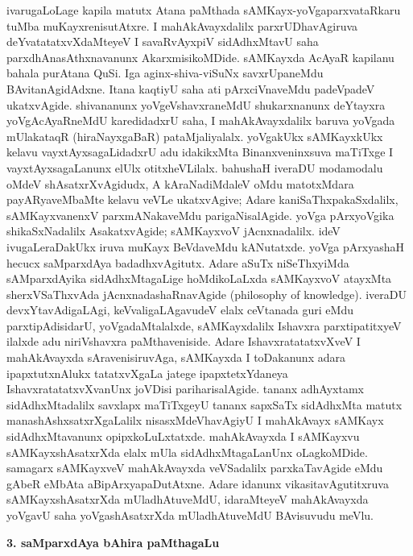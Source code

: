 ivarugaLoLage kapila matutx Atana paMthada sAMKayx-yoVgaparxvataRkaru tuMba muKayxrenisutAtxre. I mahAkAvayxdalilx parxrUDhavAgiruva deYvatatatxvXdaMteyeV I savaRvAyxpiV sidAdhxMtavU saha parxdhAnasAthxnavanunx AkarxmisikoMDide. sAMKayxda AcAyaR kapilanu bahala purAtana QuSi. Iga aginx-shiva-viSuNx savxrUpaneMdu BAvitanAgidAdxne. Itana kaqtiyU saha ati pArxciVnaveMdu padeVpadeV ukatxvAgide. shivananunx yoVgeVshavxraneMdU shukarxnanunx deYtayxra yoVgAcAyaRneMdU karedidadxrU saha, I mahAkAvayxdalilx baruva yoVgada mUlakataqR (hiraNayxgaBaR) pataMjaliyalalx. yoVgakUkx sAMKayxkUkx kelavu vayxtAyxsagaLidadxrU adu idakikxMta Binanxveninxsuva maTiTxge I vayxtAyxsagaLanunx elUlx otitxheVLilalx. bahushaH iveraDU modamodalu oMdeV shAsatxrXvAgidudx, A kAraNadiMdaleV oMdu matotxMdara payARyaveMbaMte kelavu veVLe ukatxvAgive; Adare kaniSaThxpakaSxdalilx, sAMKayxvanenxV parxmANakaveMdu parigaNisalAgide. yoVga pArxyoVgika shikaSxNadalilx AsakatxvAgide; sAMKayxvoV jAcnxnadalilx. ideV ivugaLeraDakUkx iruva muKayx BeVdaveMdu kANutatxde. yoVga pArxyashaH hecucx saMparxdAya badadhxvAgitutx. Adare aSuTx niSeThxyiMda sAMparxdAyika sidAdhxMtagaLige hoMdikoLaLxda sAMKayxvoV atayxMta sherxVSaThxvAda jAcnxnadashaRnavAgide {\rm(philosophy of knowledge).} iveraDU devxYtavAdigaLAgi, keVvaligaLAgavudeV elalx ceVtanada guri eMdu parxtipAdisidarU, yoVgadaMtalalxde, sAMKayxdalilx Ishavxra parxtipatitxyeV ilalxde adu niriVshavxra paMthaveniside. Adare IshavxratatatxvXveV I mahAkAvayxda sAravenisiruvAga, sAMKayxda I toDakanunx adara ipapxtutxnAlukx tatatxvXgaLa jatege ipapxtetxYdaneya IshavxratatatxvXvanUnx joVDisi pariharisalAgide. tananx adhAyxtamx sidAdhxMtadalilx savxlapx maTiTxgeyU tananx sapxSaTx sidAdhxMta matutx manashAshxsatxrXgaLalilx nisasxMdeVhavAgiyU I mahAkAvayx sAMKayx sidAdhxMtavanunx opipxkoLuLxtatxde. mahAkAvayxda I sAMKayxvu sAMKayxshAsatxrXda elalx mUla sidAdhxMtagaLanUnx oLagkoMDide. samagarx sAMKayxveV mahAkAvayxda veVSadalilx parxkaTavAgide eMdu gAbeR eMbAta aBipArxyapaDutAtxne. Adare idanunx vikasitavAgutitxruva sAMKayxshAsatxrXda mUladhAtuveMdU, idaraMteyeV mahAkAvayxda yoVgavU saha yoVgashAsatxrXda mUladhAtuveMdU BAvisuvudu meVlu.

\smallskip
\begin{center}
{\Large\bf 3. saMparxdAya bAhira paMthagaLu}
\end{center}

